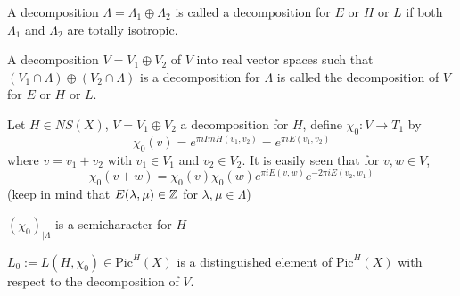 \begin{paragraph}
\begin{definition}
{} A decomposition $\Lambda=\Lambda_1\oplus \Lambda_2$ is called a decomposition for $E$ or $H$ or $L$ if both $\Lambda_1$ and $\Lambda_2$ are totally isotropic.
\end{definition}
\begin{definition}
A decomposition $V=V_1\oplus V_2$ of $V$ into real vector spaces such that $(V_1\cap \Lambda)\oplus (V_2\cap \Lambda)$ is a decomposition for $\Lambda$ is called the decomposition of $V$ for $E$ or $H$ or $L$.
\end{definition}
Let $H\in NS(X)$, $V=V_1\oplus V_2$ a decomposition for $H$, define $\chi_0:V\rightarrow T_1$ by 
\begin{equation*}
\chi_0(v)=e^{\pi i Im H(v_1,v_2)}=e^{\pi i E(v_1,v_2)}
\end{equation*}
where $v=v_1+v_2$ with $v_1\in V_1$ and $v_2\in V_2$. It is easily seen that for $v,w\in V$,
\begin{equation*}
\chi_0(v+w)=\chi_0(v)\chi_0(w) e^{\pi i E(v,w)}e^{-2\pi i E(v_2,w_1)}
\end{equation*}
(keep in mind that $E(\lambda, \mu)\in {\mathbb Z}$ for $\lambda, \mu\in \Lambda$)
\begin{corollary}
$(\chi_0)_{\mid \Lambda}$ is a semicharacter for $H$
\end{corollary}
\begin{definition}
$L_0:=L(H,\chi_0)\in \text{Pic}^H(X)$ is a distinguished element of $\text{Pic}^H(X)$ with respect to the decomposition of $V$.
\end{definition}
\end{paragraph}

